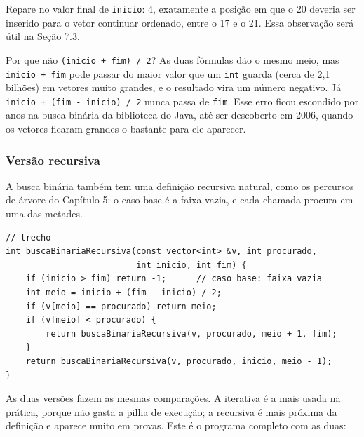 Repare no valor final de \texttt{inicio}: 4, exatamente a posição em que o 20 deveria ser inserido para o vetor continuar ordenado, entre o 17 e o 21. Essa observação será útil na Seção 7.3.

\begin{destaque}{Por que não \texttt{(inicio + fim) / 2}?}
As duas fórmulas dão o mesmo meio, mas \texttt{inicio + fim} pode passar do maior valor que um \texttt{int} guarda (cerca de 2,1 bilhões) em vetores muito grandes, e o resultado vira um número negativo. Já \texttt{inicio + (fim - inicio) / 2} nunca passa de \texttt{fim}. Esse erro ficou escondido por anos na busca binária da biblioteca do Java, até ser descoberto em 2006, quando os vetores ficaram grandes o bastante para ele aparecer.
\end{destaque}

\subsubsection{Versão recursiva}

A busca binária também tem uma definição recursiva natural, como os percursos de árvore do Capítulo 5: o caso base é a faixa vazia, e cada chamada procura em uma das metades.

\begin{codigo}
\begin{Verbatim}[breaklines=true, breaksymbolleft={}, fontsize=\footnotesize]
// trecho
int buscaBinariaRecursiva(const vector<int> &v, int procurado,
                          int inicio, int fim) {
    if (inicio > fim) return -1;      // caso base: faixa vazia
    int meio = inicio + (fim - inicio) / 2;
    if (v[meio] == procurado) return meio;
    if (v[meio] < procurado) {
        return buscaBinariaRecursiva(v, procurado, meio + 1, fim);
    }
    return buscaBinariaRecursiva(v, procurado, inicio, meio - 1);
}
\end{Verbatim}
\end{codigo}

As duas versões fazem as mesmas comparações. A iterativa é a mais usada na prática, porque não gasta a pilha de execução; a recursiva é mais próxima da definição e aparece muito em provas. Este é o programa completo com as duas:

